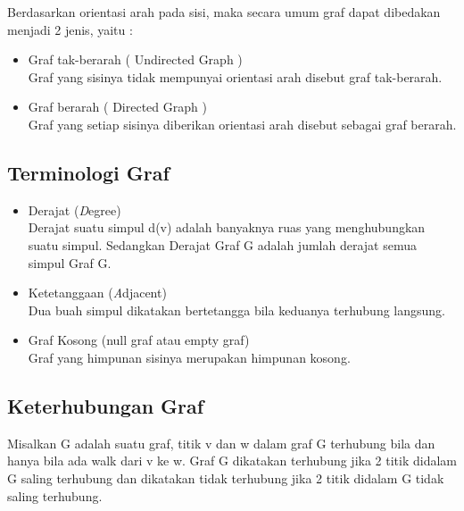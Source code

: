Berdasarkan orientasi arah pada sisi, maka secara
umum graf dapat dibedakan menjadi 2 jenis, yaitu :
\begin{itemize}
\item Graf tak-berarah ( Undirected Graph )\\
Graf yang sisinya tidak mempunyai
orientasi arah disebut graf tak-berarah.

\item Graf berarah ( Directed Graph )\\
Graf yang setiap sisinya diberikan
orientasi arah disebut sebagai graf berarah.
\end{itemize}


\subsection{Terminologi Graf}
\begin{itemize}
\item Derajat (\textit Degree)\\
Derajat suatu simpul d(v) adalah banyaknya ruas yang menghubungkan suatu
simpul.
Sedangkan Derajat Graf G adalah jumlah derajat semua simpul Graf G. 


\item Ketetanggaan (\textit Adjacent)\\
Dua buah simpul dikatakan bertetangga bila keduanya terhubung langsung.\



\item Graf Kosong (null graf atau empty graf)\\
Graf yang himpunan sisinya merupakan himpunan kosong. 

\end{itemize}



\subsection{Keterhubungan Graf}

Misalkan G adalah suatu graf, titik v dan w dalam graf G terhubung bila dan hanya bila ada walk dari v ke w.
Graf G dikatakan terhubung jika 2 titik didalam G saling terhubung dan dikatakan tidak terhubung jika 2 titik didalam G tidak saling terhubung.

